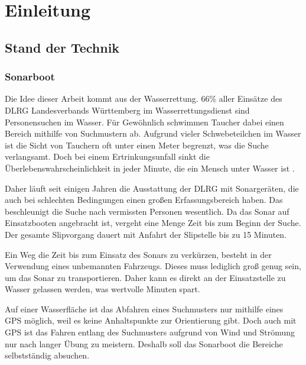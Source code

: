 
\chapter{Einleitung}
\label{ch:Introduction}

\section{Stand der Technik}
\label{sec:standdertechnik}

\subsection{Sonarboot}
\label{sec:sonarboot}

Die Idee dieser Arbeit kommt aus der Wasserrettung. 66\% aller Einsätze des DLRG Landesverbands Württemberg im Wasserrettungsdienst sind Personensuchen im Wasser\cite{dlrgwuerttemberg2017}. Für Gewöhnlich schwimmen Taucher dabei einen Bereich mithilfe von Suchmustern ab. Aufgrund vieler Schwebeteilchen im Wasser ist die Sicht von Tauchern oft unter einen Meter begrenzt, was die Suche verlangsamt. Doch bei einem Ertrinkungsunfall sinkt die Überlebenswahrscheinlichkeit in jeder Minute, die ein Mensch unter Wasser ist \cite{teising2009neonatologische, roeggla2001}.

Daher läuft seit einigen Jahren die Ausstattung der DLRG mit Sonargeräten, die auch bei schlechten Bedingungen einen großen Erfassungsbereich haben. Das beschleunigt die Suche nach vermissten Personen wesentlich. Da das Sonar auf Einsatzbooten angebracht ist, vergeht eine Menge Zeit bis zum Beginn der Suche. Der gesamte Slipvorgang dauert mit Anfahrt der Slipstelle bis zu 15 Minuten.

Ein Weg die Zeit bis zum Einsatz des Sonars zu verkürzen, besteht in der Verwendung eines unbemannten Fahrzeugs. Dieses muss lediglich groß genug sein, um das Sonar zu transportieren. Daher kann es direkt an der Einsatzstelle zu Wasser gelassen werden, was wertvolle Minuten spart.

Auf einer Wasserfläche ist das Abfahren eines Suchmusters nur mithilfe eines GPS möglich, weil es keine Anhaltspunkte zur Orientierung gibt. Doch auch mit GPS ist das Fahren entlang des Suchmusters aufgrund von Wind und Strömung nur nach langer Übung zu meistern. Deshalb soll das Sonarboot die Bereiche selbstständig absuchen.

